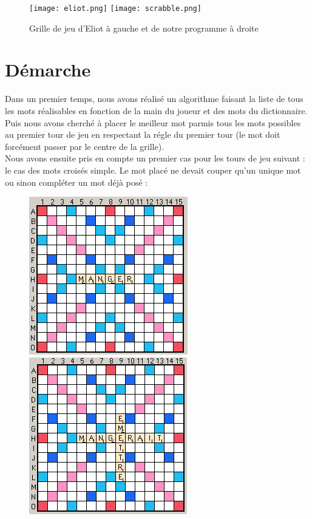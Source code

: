 \documentclass[a4paper,8pt,french,fleqn]{article}
\begin{document}
\begin{figure}[h]
  \begin{center}
    \vspace{0.5cm}
    \texttt{[image: eliot.png]}
    \hspace{1.5cm}
    \texttt{[image: scrabble.png]}
    \caption{Grille de jeu d'Eliot à gauche et de notre programme à droite}
  \end{center}
\end{figure}

\newpage
 
\section{Démarche}

Dans un premier temps, nous avons réalisé un algorithme faisant la liste de tous les mots réalisables en fonction de la main du joueur et des mots du dictionnaire. \\

Puis nous avons cherché à placer le meilleur mot parmis tous les mots possibles au premier tour de jeu en respectant la régle du premier tour (le mot doit forcément passer par le centre de la grille). \\

Nous avons ensuite pris en compte un premier cas pour les tours de jeu suivant : le cas des mots croisés simple. Le mot placé ne devait couper qu'un unique mot ou sinon compléter un mot déjà posé :

\begin{figure}[h]
  \begin{center}
    \vspace{0.2cm}
    \includegraphics[scale=0.5]{cas1a.png}
    \hspace{1.5cm}
    \includegraphics[scale=0.5]{cas1b.png}
  \end{center}
\end{figure}
\end{document}
